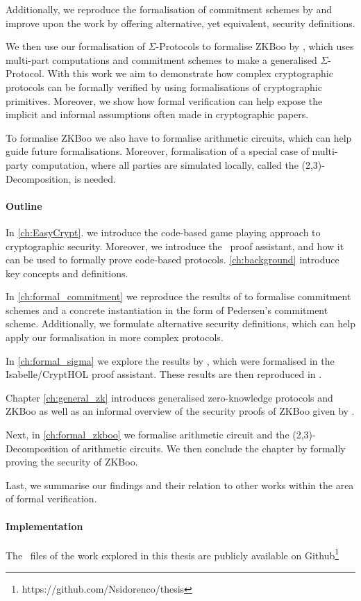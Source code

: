 Additionally, we reproduce the formalisation of commitment schemes by
\citet{DBLP:journals/corr/MetereD17} and improve upon the work by offering
alternative, yet equivalent, security definitions.

We then use our formalisation of $\Sigma$-Protocols to formalise ZKBoo by
\citet{zkboo}, which uses multi-part computations and commitment schemes to make
a generalised $\Sigma$-Protocol. With this work we aim to demonstrate how complex
cryptographic protocols can be formally verified by using formalisations of
cryptographic primitives. Moreover, we show how formal verification can help expose
the implicit and informal assumptions often made in cryptographic papers.

To formalise ZKBoo we also have to formalise arithmetic circuits, which can help guide
future formalisations. Moreover, formalisation of a special case of multi-party
computation, where all parties are simulated locally, called the
(2,3)-Decomposition, is needed.


\paragraph{Outline}
In \autoref{ch:EasyCrypt}. we introduce the code-based game playing approach to
cryptographic security. Moreover, we introduce the \easycrypt\ proof assistant,
and how it can be used to formally prove code-based protocols.
\autoref{ch:background} introduce key concepts and definitions.

In \autoref{ch:formal_commitment} we reproduce the results of
\citet{DBLP:journals/corr/MetereD17} to formalise commitment schemes and a
concrete instantiation in the form of Pedersen's commitment scheme.
Additionally, we formulate alternative security definitions, which can help
apply our formalisation in more complex protocols.

In \autoref{ch:formal_sigma} we explore the results by
\citet{cryptoeprint:2019:1185}, which were formalised in the Isabelle/CryptHOL
proof assistant. These results are then reproduced in \easycrypt.

Chapter \ref{ch:general_zk} introduces generalised zero-knowledge protocols and
ZKBoo as well as an informal overview of the security proofs of ZKBoo given by \citet{zkboo}.

Next, in \autoref{ch:formal_zkboo} we formalise arithmetic circuit and the
(2,3)-Decomposition of arithmetic circuits. We then conclude the chapter by
formally proving the security of ZKBoo.

Last, we summarise our findings and their relation to other works within the
area of formal verification.

\paragraph{Implementation}
The \easycrypt\ files of the work explored in this thesis
are publicly available on Github\footnote{https://github.com/Nsidorenco/thesis}

